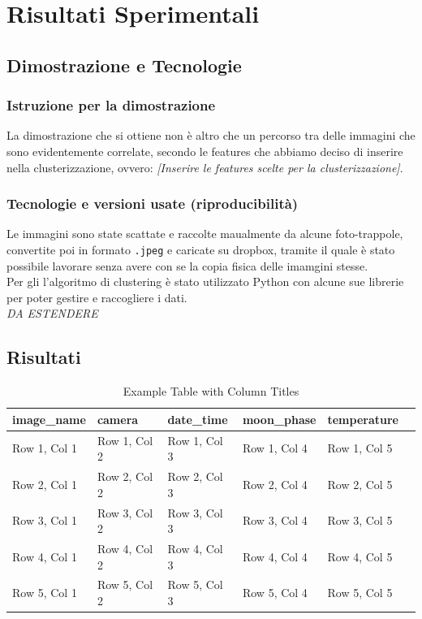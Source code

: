 \documentclass[12pt,a4paper,twoside]{article}
\begin{document}
\section{Risultati Sperimentali}

\subsection{Dimostrazione e Tecnologie}
\subsubsection{Istruzione per la dimostrazione}
La dimostrazione che si ottiene non è altro che un percorso tra delle immagini che sono 
evidentemente correlate, secondo le features che abbiamo deciso di inserire nella clusterizzazione, 
ovvero: \textit{[Inserire le features scelte per la clusterizzazione]}.
\subsubsection{Tecnologie e versioni usate (riproducibilità)}
Le immagini sono state scattate e raccolte maualmente da alcune foto-trappole, convertite poi in 
formato \texttt{.jpeg} e caricate su dropbox, tramite il quale è stato possibile lavorare senza 
avere con se la copia fisica delle imamgini stesse.\\ 
Per gli l'algoritmo di clustering è stato utilizzato Python con alcune sue librerie per poter 
gestire e raccogliere i dati.\\
\textit{DA ESTENDERE} 

\subsection{Risultati}

{\renewcommand{\arraystretch}{2}}
\begin{table}
  \begin{tabularx}{\linewidth}{|X|X|X|X|X|X|}
    \hline
    \textbf{image\_name} & \textbf{camera} & \textbf{date\_time} & \textbf{moon\_phase} & \textbf{temperature} \\
    \hline
    Row 1, Col 1 & Row 1, Col 2 & Row 1, Col 3 & Row 1, Col 4 & Row 1, Col 5 \\
    \hline
    Row 2, Col 1 & Row 2, Col 2 & Row 2, Col 3 & Row 2, Col 4 & Row 2, Col 5 \\
    \hline
    Row 3, Col 1 & Row 3, Col 2 & Row 3, Col 3 & Row 3, Col 4 & Row 3, Col 5 \\
    \hline
    Row 4, Col 1 & Row 4, Col 2 & Row 4, Col 3 & Row 4, Col 4 & Row 4, Col 5 \\
    \hline
    Row 5, Col 1 & Row 5, Col 2 & Row 5, Col 3 & Row 5, Col 4 & Row 5, Col 5 \\
    \hline
  \end{tabularx}
  \caption{Example Table with Column Titles}
  \label{tab:example}
\end{table}
\end{document}
